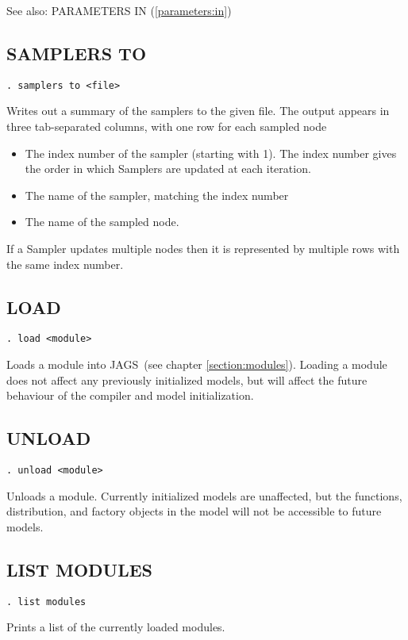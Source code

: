 \documentclass[11pt, a4paper, titlepage]{report}
\newcommand{\JAGS}{\textsf{JAGS}}
\begin{document}
See also: PARAMETERS IN (\ref{parameters:in})

\subsection{SAMPLERS TO}
\label{samplers:to}
\begin{verbatim}
. samplers to <file>
\end{verbatim}
Writes out a summary of the samplers to the given file.  The output appears
in three tab-separated columns, with one row for each sampled node
\begin{itemize}
\item The index number of the sampler (starting with 1). The index number 
gives the order in which Samplers are updated at each iteration.
\item The name of the sampler, matching the index number
\item The name of the sampled node. 
\end{itemize}
If a Sampler updates multiple nodes then it is represented by multiple rows
with the same index number.

\subsection{LOAD}
\label{load}
\begin{verbatim}
. load <module>
\end{verbatim}
Loads a module into \JAGS\ (see chapter \ref{section:modules}). Loading
a module does not affect any previously initialized models, but will
affect the future behaviour of the compiler and model initialization.

\subsection{UNLOAD}
\label{unload}
\begin{verbatim}
. unload <module>
\end{verbatim}
Unloads a module. Currently initialized models are unaffected, but
the functions, distribution, and factory objects in the model will not
be accessible to future models.

\subsection{LIST MODULES}
\label{list:modules}
\begin{verbatim}
. list modules
\end{verbatim}
Prints a list of the currently loaded modules.
\end{document}
